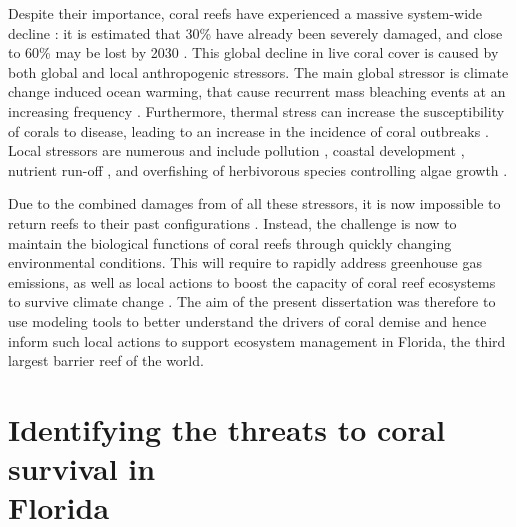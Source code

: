 \documentclass[12pt ,a4paper]{article}
\begin{document}
Despite their importance, coral reefs have experienced a massive system-wide decline \citep{hoegh2017coral}: it is estimated  that 30\% have already been severely damaged, and close to 60\% may be lost by 2030 \citep{hughes2003climate}. This global decline in live coral cover \citep{gardner2003long,pandolfi2003global,bruno2007regional} is caused by both global and local anthropogenic stressors. The main global stressor is climate change induced ocean warming, that cause recurrent mass bleaching events at an increasing frequency \citep{connell199730, hughes2018spatial}. Furthermore, thermal stress can increase the susceptibility of corals to disease, leading to an increase in the incidence of coral outbreaks \citep{harvell2002climate,bruno2007thermal,muller2012caribbean}. Local stressors are numerous and include pollution \citep{loya1980effects}, coastal development \citep{erftemeijer2012environmental, cunning2019extensive}, nutrient run-off \citep{hughes2003climate,sheppard2017biology}, and overfishing of herbivorous species controlling algae growth \citep{jackson2001historical}.

Due to the combined damages from of all these stressors, it is now impossible to return reefs to their past configurations \citep{hughes2017coral}. Instead, the challenge is now to maintain the biological functions of coral reefs through quickly changing environmental conditions. This will require to rapidly address greenhouse gas emissions, as well as local actions to boost the capacity of coral reef ecosystems to survive climate change \citep{hughes2003climate,knowlton2008shifting,graham2015predicting}. The aim of the present dissertation was therefore to use modeling tools to better understand the drivers of coral demise and hence inform such local actions to support ecosystem management in Florida, the third largest barrier reef of the world.

\section{Identifying the threats to coral survival in \\Florida}
\end{document}
